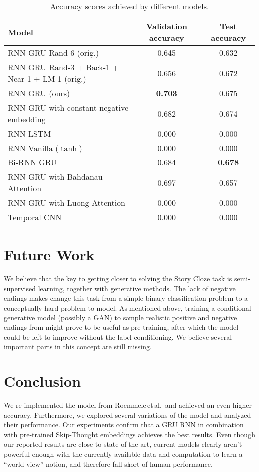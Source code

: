 \documentclass{article}
\begin{document}
\begin{table}[btp]\centering
\begin{tabular}{lcc}
\toprule
Model    	& Validation accuracy  	 		  & Test accuracy  					\\
\midrule
RNN GRU \citep{Roemmele2017AnTest} Rand-6 (orig.)    	& 0.645  	 		  & 0.632  \\
RNN GRU \citep{Roemmele2017AnTest} Rand-3 + Back-1
+ Near-1 + LM-1 (orig.)    	& 0.656  	 		  & 0.672  \\
\midrule

RNN GRU \citep{Roemmele2017AnTest} (ours)    	& \textbf{0.703}  	 		  & 0.675  \\
RNN GRU with constant negative embedding    	& 0.682  	 		  & 0.674 \\
RNN LSTM		& 0.000 		 	  & 0.000  \\
RNN Vanilla ($\tanh$)		& 0.000 		 	  & 0.000  \\
Bi-RNN GRU		& 0.684   			  & \textbf{0.678}  \\
RNN GRU with Bahdanau \citep{Bahdanau2016End-to-EndRecognition} Attention     	& 0.697	 	 		  & 0.657  \\
RNN GRU with Luong \citep{Luong2015EffectiveTranslation} Attention    	& 0.000	 	 		  & 0.000  \\
\midrule
Temporal CNN   	& 0.000	 	 		  & 0.000\\\bottomrule
\end{tabular}
\caption{Accuracy scores achieved by different models.}\label{tab:results}
\end{table}

\section{Future Work}\label{sec:futurework}
We believe that the key to getting closer to solving the Story Cloze task is semi-supervised learning, together with generative methods. The lack of negative endings makes change this task from a simple binary classification problem to a conceptually hard problem to model. As mentioned above, training a conditional generative model (possibly a GAN) to sample realistic positive and negative endings from might prove to be useful as pre-training, after which the model could be left to improve without the label conditioning. We believe several important parts in this concept are still missing.

\section{Conclusion}\label{sec:conclusion}
We re-implemented the model from Roemmele\,et\,al.\,\citep{Roemmele2017AnTest} and achieved an even higher accuracy. Furthermore, we explored several variations of the model and analyzed their performance. Our experiments confirm that a GRU RNN in combination with pre-trained Skip-Thought embeddings achieves the best results. Even though our reported results are close to state-of-the-art, current models clearly aren't powerful enough with the currently available data and computation to learn a ``world-view'' notion, and therefore fall short of human performance.


\end{document}
